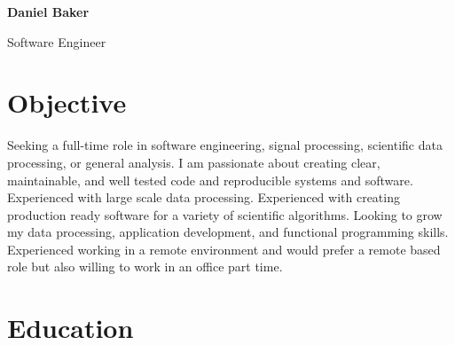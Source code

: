 



\textbf{\Huge Daniel Baker}

{\Large\vspace{0.7em}\hspace{0.3em} Software Engineer}
\begin{profile}
\end{profile}

\section{Objective}

\begin{blockquote}
    Seeking a full-time role in software engineering, signal processing, scientific data processing, or general analysis.
    I am passionate about creating clear, maintainable, and well tested code and reproducible systems and software.
    Experienced with large scale data processing.
    Experienced with creating production ready software for a variety of scientific algorithms.
    Looking to grow my data processing, application development, and functional programming skills.
    Experienced working in a remote environment and would prefer a remote based role but also willing to work in an office part time.
\end{blockquote}

\section{Education}


